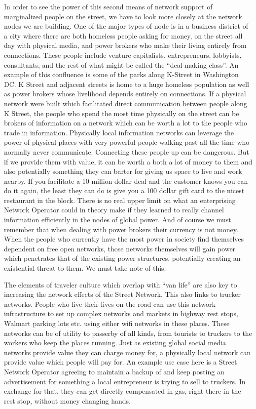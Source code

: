In order to see the power of this second means of network support of marginalized people on the street, we have to look more closely at the network nodes we are building.  One of the major types of node is in a business district of a city where there are both homeless people asking for money, on the street all day with physical media, and power brokers who make their living entirely from connections.  These people include venture capitalists, entrepreneurs, lobbyists, consultants, and the rest of what might be called the ``deal-making class''.  An example of this confluence is some of the parks along K-Street in Washington DC.  K Street and adjacent streets is home to a huge homeless population as well as power brokers whose livelihood depends entirely on connections.  If a physical network were built which facilitated direct communication between people along K Street, the people who spend the most time physically on the street can be brokers of information on a network which can be worth a lot to the people who trade in information.  Physically local information networks can leverage the power of physical places with very powerful people walking past all the time who normally never communicate.  Connecting these people up can be dangerous.  But if we provide them with value, it can be worth a both a lot of money to them and also potentially something they can barter for giving us space to live and work nearby.  If you facilitate a 10 million dollar deal and the customer knows you can do it again, the least they can do is give you a 100 dollar gift card to the nicest restaurant in the block.  There is no real upper limit on what an enterprising Network Operator could in theory make if they learned to really channel information efficiently in the nodes of global power.  And of course we must remember that when dealing with power brokers their currency is not money.  When the people who currently have the most power in society find themselves dependent on free open networks, those networks themselves will gain power which penetrates that of the existing power structures, potentially creating an existential threat to them.  We must take note of this.

The elements of traveler culture which overlap with ``van life'' are also key to increasing the network effects of the Street Network.  This also links to trucker networks.  People who live their lives on the road can use this network infrastructure to set up complex networks and markets in highway rest stops, Walmart parking lots etc. using either wifi networks in these places.  These networks can be of utility to passerby of all kinds, from tourists to truckers to the workers who keep the places running.  Just as existing global social media networks provide value they can charge money for, a physically local network can provide value which people will pay for.  An example use case here is a Street Network Operator agreeing to maintain a backup of and keep posting an advertisement for something a local entrepreneur is trying to sell to truckers.  In exchange for that, they can get directly compensated in gas, right there in the rest stop, without money changing hands.  


